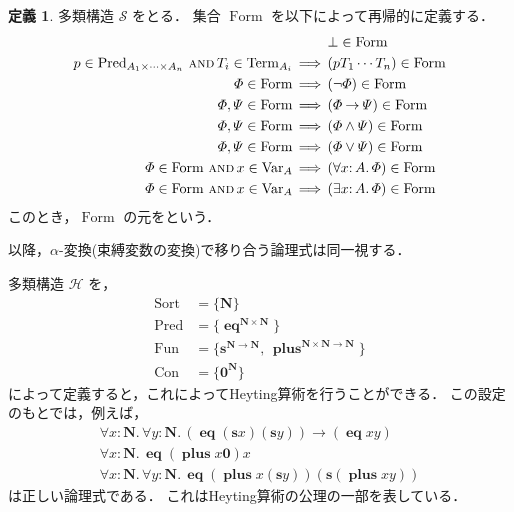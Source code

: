 \documentclass[./main]{subfiles}
\newcommand{\bto}{\mathbin{\to}}
\newcommand{\ocl}{\mathord{:}}
\newcommand{\op}[1]{\mathop{\mathrm{#1}}\nolimits}
\newcommand{\comb}[1]{\mathbf{#1}}
\newcommand{\combop}[1]{\mathop{\mathbf{#1}}\nolimits}
\newcommand{\textem}[1]{\textbf{\textgt{#1}}}
\newcommand{\mathscr}[1]{\mathcal{#1}}
\newcommand{\fl}[1]{}
\newcommand{\ats}{\,}
\newcommand{\fwland}{\,\mathbin{\text{\textsc{and}}}\,}
\newcommand{\fLongrightarrow}{\,\Longrightarrow\,}
\theoremstyle{definition}
\newtheorem{defi}[theo]{定義}
\begin{document}
\begin{defi}
多類構造 $ \mathscr{S} $ をとる．
集合 $ \op{Form} $ を以下によって再帰的に定義する．
\begin{align*}
& \hphantom{{} \fLongrightarrow {}} \bot \in \op{Form} \\
p \in \op{Pred} _{A _1 \times \cdots \times A _n} \fwland T _i \in \op{Term} _{A _i} & \fLongrightarrow (p T _1 \cdots T _n) \in \op{Form} \\
\varPhi \in \op{Form} & \fLongrightarrow (\lnot \varPhi) \in \op{Form} \\
\varPhi, \varPsi \in \op{Form} & \fLongrightarrow (\varPhi \bto \varPsi) \in \op{Form} \\
\varPhi, \varPsi \in \op{Form} & \fLongrightarrow (\varPhi \land \varPsi) \in \op{Form} \\
\varPhi, \varPsi \in \op{Form} & \fLongrightarrow (\varPhi \lor \varPsi) \in \op{Form} \\
\varPhi \in \op{Form} \fwland x \in \op{Var} _A & \fLongrightarrow (\forall x \ocl\, A.\, \varPhi) \in \op{Form} \\
\varPhi \in \op{Form} \fwland x \in \op{Var} _A & \fLongrightarrow (\exists x \ocl\, A.\, \varPhi) \in \op{Form}
\end{align*}
このとき，$ \op{Form} $ の元を\textem{論理式\fl{formula}}という．
\end{defi}

以降，$ \alpha $-変換(束縛変数の変換)で移り合う論理式は同一視する．

多類構造 $ \mathscr{H} $ を，
\begin{align*}
\op{Sort} & = \{ \comb{N} \} \\
\op{Pred} & = \{ \combop{eq} ^{\comb{N} \times \comb{N}} \} \\
\op{Fun} & = \{ \comb{s} ^{\comb{N} \to \comb{N}},\ats \combop{plus} ^{\comb{N} \times \comb{N} \to \comb{N}} \} \\
\op{Con} & = \{ \comb{0} ^{\comb{N}} \}
\end{align*}
によって定義すると，これによってHeyting算術を行うことができる．
この設定のもとでは，例えば，
\begin{gather*}
\forall x \ocl\, \comb{N}.\, \forall y \ocl\, \comb{N}.\, (\combop{eq} (\comb{s} x) (\comb{s} y)) \bto (\combop{eq} xy) \\
\forall x \ocl\, \comb{N}.\, {\combop{eq} (\combop{plus} x \comb{0}) x} \\
\forall x \ocl\, \comb{N}.\, \forall y \ocl\, \comb{N}.\, \combop{eq} (\combop{plus} x (\comb{s} y)) (\comb{s} (\combop{plus} x y))
\end{gather*}
は正しい論理式である．
これはHeyting算術の公理の一部を表している．
\end{document}
